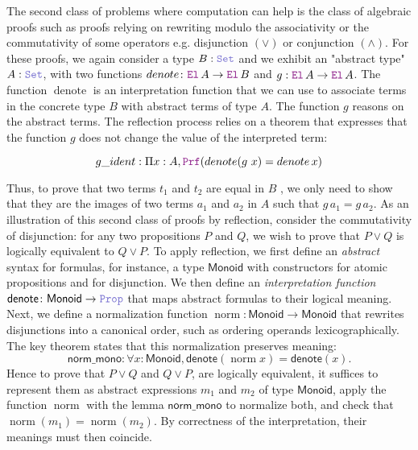\medskip

The second class of problems where computation can help is the class of algebraic proofs such as proofs relying on rewriting modulo the associativity or the commutativity of some operators e.g. disjunction $(\lor)$ or conjunction $(\land)$.
For these proofs, we again consider a type $B: \set$ and we exhibit an "abstract type" $A: \set$, with two functions $\mathop{denote} \colon {\el}\,A \ra {\el}\,B$ and $g: \el{}\,A \ra \el{}\,A$.
The function $\mathop{denote}$ is an interpretation function that we can use to associate terms in the concrete type $B$ with abstract terms of type $A$.
The function $g$ reasons on the abstract terms. The reflection process relies on a theorem that expresses that the function $g$ does not change the value of the interpreted
term:

\begin{equation*}
  g\_ident : \Pi x: A, \prf (\mathop{denote}(g~x) = \mathop{denote} x)
\end{equation*}

Thus, to prove that two terms $t_1$ and $t_2$ are equal in $B$ , we only need to show that they are the images of two terms $a_1$ and $a_2$ in $A$ such that $g\,a_1 = g\,a_2$.
As an illustration of this second class of proofs by reflection, consider the commutativity of disjunction: for any two propositions $P$ and $Q$, we wish to prove that $P \lor Q$ is logically equivalent to $Q \lor P$.
To apply reflection, we first define an \emph{abstract} syntax for formulas, for instance, a type $\mathsf{Monoid}$ with constructors for atomic propositions and for disjunction.
We then define an \emph{interpretation function} $\mathsf{denote} \colon \mathsf{Monoid} \to \prop$ that maps abstract formulas to their logical meaning. 
Next, we define a normalization function $\mathop{norm}: \mathsf{Monoid} \to \mathsf{Monoid}$ that rewrites disjunctions into a canonical order, such as ordering operands lexicographically.
The key theorem states that this normalization preserves meaning:
\[
\mathsf{norm\_mono} : \forall x : \mathsf{Monoid}, \mathsf{denote}(\mathop{norm} x) = \mathsf{denote}(x).
\]
Hence to prove that $P \lor Q$ and $Q \lor P$, are logically equivalent, it suffices to represent them as abstract expressions $m_1$ and $m_2$ of type $\mathsf{Monoid}$, apply the function $\mathop{norm}$ with the lemma $\mathsf{norm\_mono}$ to normalize both, and check that $\mathop{norm}(m_1) = \mathop{norm}(m_2)$.
By correctness of the interpretation, their meanings must then coincide.


